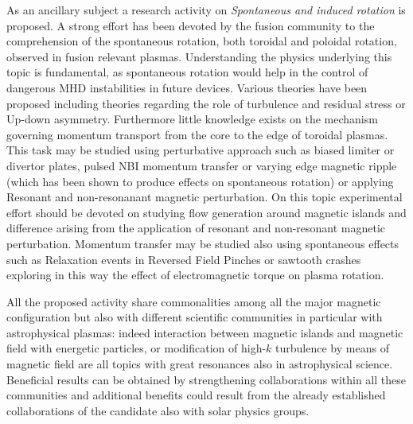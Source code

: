 \documentclass[12pt,a4paper]{article}
\begin{document}
As an ancillary subject a research activity on 
\emph{Spontaneous and induced rotation} is proposed. 
A strong effort has been devoted by the fusion   community to the
comprehension of 
the spontaneous rotation, both toroidal and poloidal rotation,
observed in fusion relevant plasmas. 
Understanding the physics underlying this topic is fundamental, as spontaneous
rotation would help in the control of 
dangerous MHD instabilities in future devices. Various theories have
been proposed including theories 
regarding the role of turbulence and residual stress or Up-down
asymmetry. Furthermore little knowledge 
exists on the mechanism governing momentum transport from the core to
the edge of toroidal plasmas. 
This task may be studied using perturbative approach such as biased
limiter or divertor plates, 
pulsed NBI momentum transfer or varying edge magnetic ripple (which
has been shown to produce 
effects on spontaneous rotation) or applying Resonant and
non-resonanant magnetic perturbation. On this topic experimental
effort should be devoted on studying flow generation around magnetic
islands and difference arising from the application of resonant and
non-resonant magnetic perturbation. Momentum transfer may be studied
also using spontaneous 
effects such as Relaxation events in Reversed Field Pinches or
sawtooth crashes exploring
in this way the effect 
of electromagnetic torque on plasma rotation.
\vspace{0.5cm}

All the proposed activity
share commonalities among all the major magnetic configuration but also with different scientific communities in
particular with astrophysical plasmas: indeed interaction between
magnetic islands and magnetic field with energetic particles, or
modification of high-$k$ turbulence by means of magnetic field are all
topics with great resonances also in astrophysical
science. Beneficial results can be obtained by strengthening
collaborations within all these communities and additional benefits could
result from the already established collaborations of the candidate
also with solar physics
groups.


\end{document}
